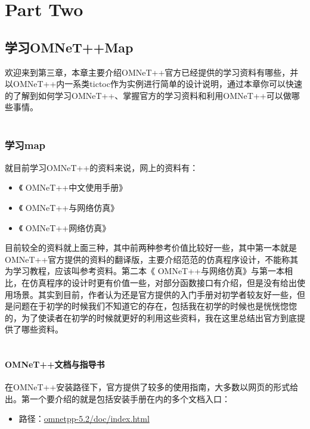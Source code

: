 \part{Part Two}

\chapter{学习OMNeT++Map}

\begin{summary}
欢迎来到第三章，本章主要介绍OMNeT++官方已经提供的学习资料有哪些，并以OMNeT++内一系类tictoc作为实例进行简单的设计说明，通过本章你可以快速的了解到如何学习OMNeT++、掌握官方的学习资料和利用OMNeT++可以做哪些事情。\\ \\
\end{summary}

\section{学习map}
就目前学习OMNeT++的资料来说，网上的资料有：
\begin{itemize}
	\item 《 OMNeT++中文使用手册》
	\item 《 OMNeT++与网络仿真》
	\item 《 OMNeT++网络仿真》 
\end{itemize}

目前较全的资料就上面三种，其中前两种参考价值比较好一些，其中第一本就是OMNeT++官方提供的资料的翻译版，主要介绍范范的仿真程序设计，不能称其为学习教程，应该叫参考资料。第二本《 OMNeT++与网络仿真》与第一本相比，在仿真程序的设计时更有价值一些，对部分函数接口有介绍，但是没有给出使用场景。其实到目前，作者认为还是官方提供的入门手册对初学者较友好一些，但是问题在于初学的时候我们不知道它的存在，包括我在初学的时候也是恍恍惚惚的，为了使读者在初学的时候就更好的利用这些资料，我在这里总结出官方到底提供了哪些资料。\\ \\

\subsection{OMNeT++文档与指导书}
在OMNeT++安装路径下，官方提供了较多的使用指南，大多数以网页的形式给出。第一个要介绍的就是包括安装手册在内的多个文档入口：

\begin{itemize}
\item 路径：\url{omnetpp-5.2/doc/index.html}
\end{itemize}

